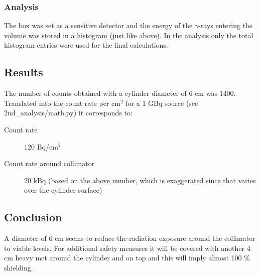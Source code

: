 \documentclass[a4paper]{article}
\begin{document}
\subsubsection{Analysis}
The box was set as a sensitive detector and the energy of the $\gamma$-rays entering the volume was stored in a histogram (just like above). In the analysis only the total histogram entries were used for the final calculations.

\subsection{Results}
The number of counts obtained with a cylinder diameter of 6 cm was 1400.
Translated into the count rate per cm$^2$ for a 1 GBq source (see 2nd\_analysis/math.py) it corresponds to:
\begin{description}
  \item[Count rate] 120 Bq/cm$^2$
  \item[Count rate around collimator] 20 kBq (based on the above number, which is exaggerated since that varies over the cylinder surface)
\end{description}

\subsection{Conclusion}
A diameter of 6 cm seems to reduce the radiation exposure around the collimator to viable levels. For additional safety measures it will be covered with another 4 cm heavy met around the cylinder and on top and this will imply almost 100 \% shielding.
\end{document}

